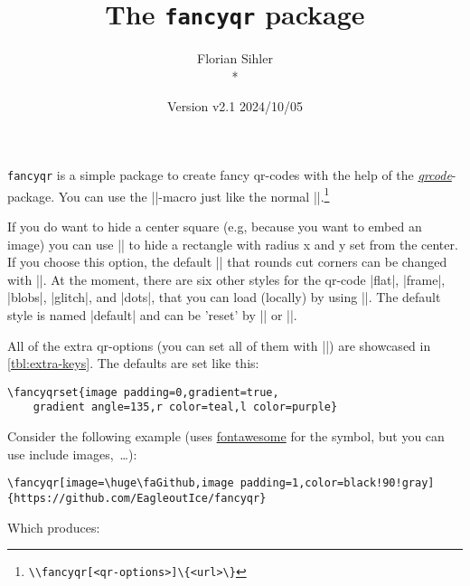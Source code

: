 \documentclass[parskip=half,english,numbers=noenddot,footnotes=nomultiple,oneside]{scrartcl}
\title{The \texttt{fancyqr} package}
\author{%
	\texorpdfstring{Florian Sihler\medskip\\*
		\fancyqr{https://github.com/EagleoutIce/fancyqr}
	}{Florian Sihler}}
\date{Version v2.1 \textendash{} 2024/10/05}
\def\ltx#1{\lstinline/#1/}
\begin{document}
   \maketitle


	\texttt{fancyqr} is a simple package to create fancy qr-codes with the help of the \textit{\href{https://www.ctan.org/pkg/qrcode}{qrcode}}-package.
	You can use the |\fancyqr|-macro just like the normal |\qrcode|.\footnote{\ltx{\\fancyqr[<qr-options>]\{<url>\}}}

	If you do want to hide a center square (e.g, because you want to embed an image) you can use || to hide a rectangle with radius x and y set from the center. If you choose this option, the default |\FancyQrRoundCut| that rounds cut corners can be changed with |\FancyQrHardCut|.
	At the moment, there are six other styles for the qr-code |flat|, |frame|, |blobs|, |glitch|, and |dots|, that you can load (locally) by using ||. The default style is named |default| and can be 'reset' by || or |\FancyQrLoadDefault|.

	All of the extra qr-options (you can set all of them with ||) are showcased in \autoref{tbl:extra-keys}.
	The defaults are set like this:
\begin{lstlisting}
\fancyqrset{image padding=0,gradient=true,
	gradient angle=135,r color=teal,l color=purple}
\end{lstlisting}
	Consider the following example (uses \href{https://www.ctan.org/pkg/fontawesome}{fontawesome} for the symbol, but you can use include images,~\ldots):
\begin{lstlisting}
\fancyqr[image=\huge\faGithub,image padding=1,color=black!90!gray]{https://github.com/EagleoutIce/fancyqr}
\end{lstlisting}

	\parbox[c]{.3\linewidth}{Which produces:}\hfill\parbox[c]{.4\linewidth}{\raggedleft{}}\par
\end{document}
